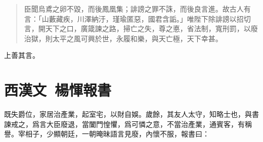 \begin{quotation}
臣聞烏鳶之卵不毀，而後鳳凰集；誹謗之罪不誅，而後良言進。故古人有言：「山藪藏疾，川澤納汙，瑾瑜匿惡，國君含詬。」唯陛下除誹謗以招切言，開天下之口，廣箴諫之路，掃亡之失，尊之悳，省法制，寬刑罰，以廢治獄，則太平之風可興於世，永履和樂，與天亡極，天下幸甚。
\end{quotation}

上善其言。

\theendnotes

\section[楊惲報孫會宗書\quad{\small 西漢文}]{{\normalsize 西漢文\ 楊惲}\quad 報書}
既失爵位，家居治產業，起室宅，以財自娛。歲餘，其友人太守，知略士也，與書諫戒之，爲言大臣廢退，當闔門惶懼，爲可憐之意，不當治產業，通賓客，有稱譽。宰相子，少顯朝廷，一朝晻昧語言見廢，內懷不服，報書曰：

